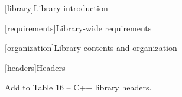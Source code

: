 
[library]{Library introduction}

\setcounter{section}{4}

[requirements]{Library-wide requirements}

[organization]{Library contents and organization}

\setcounter{subsubsection}{1}

[headers]{Headers}

\pnum
Add  to Table 16 -- C++ library headers.
